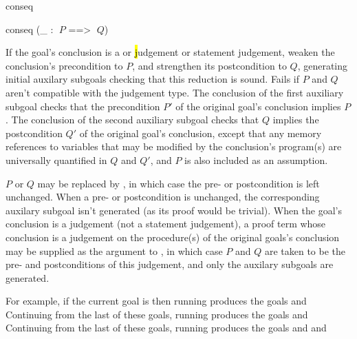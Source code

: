 \begin{tactic}{conseq}
  \begin{tsyntax}{conseq (_ : $\;P$ ==> $\;Q$)}

    If the goal's conclusion is a \prhl or \hl judgement or statement
    judgement, weaken the conclusion's precondition to $P$, and
    strengthen its postcondition to $Q$, generating initial auxilary
    subgoals checking that this reduction is sound. Fails if $P$ and
    $Q$ aren't compatible with the judgement type. The conclusion of
    the first auxiliary subgoal checks that the precondition $P'$ of
    the original goal's conclusion implies $P$. The conclusion of the
    second auxiliary subgoal checks that $Q$ implies the postcondition
    $Q'$ of the original goal's conclusion, except that any memory
    references to variables that may be modified by the conclusion's
    program(s) are universally quantified in $Q$ and $Q'$, and $P$ is
    also included as an assumption.

    $P$ or $Q$ may be replaced by \ec{_}, in which case the pre- or
    postcondition is left unchanged. When a pre- or postcondition is
    unchanged, the corresponding auxilary subgoal isn't generated (as
    its proof would be trivial). When the goal's conclusion is a
    judgement (not a statement judgement), a proof term whose
    conclusion is a judgement on the procedure(s) of the original
    goals's conclusion may be supplied as the argument to ,
    in which case $P$ and $Q$ are taken to be the pre- and
    postconditions of this judgement, and only the auxilary subgoals
    are generated.

    \medskip For example, if the current goal is
     then
    running 
    produces the goals
    and
    Continuing from the last of these goals,
    running 
    produces the goals
    and
    Continuing from the last of these goals,
    running 
    produces the goals
    and
    and


\end{tsyntax}
\end{tactic}
